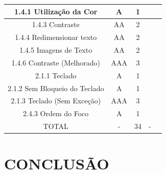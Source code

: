 \documentclass[a4paper]{article}
\begin{document}
\begin{titlepage}
\begin{center}
\begin{longtable}{|c|c|c|c|c|}
		\hline
		1.4.1 Utilização da Cor & A & 1 & & \\
		\hline
		1.4.3 Contraste & AA & 2 & & \\
		\hline
		1.4.4 Redimensionar texto & AA & 2 & & \\
		\hline
		1.4.5 Imagens de Texto & AA & 2 & & \\
		\hline
		1.4.6 Contraste (Melhorado) & AAA & 3 & & \\
		\hline
		2.1.1 Teclado & A & 1 & & \\
		\hline
		2.1.2 Sem Bloqueio do Teclado & A & 1 & & \\
		\hline
		2.1.3 Teclado (Sem Exceção) & AAA & 3 & & \\
		\hline
		2.4.3 Ordem do Foco & A & 1 & & \\
		\hline
		TOTAL & - & 34 & - & \\
		\hline
	\end{longtable}
\end{center}

\section{CONCLUSÃO}


\end{titlepage}
\end{document}
